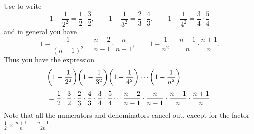 \documentclass[a4paper,oneside,12pt]{article}
\begin{document}
\begin{problem}
{\begin{solution}
Use  to
write
\[
1 - \frac{1}{2^2}
=
\frac{1}{2} \cdot \frac{3}{2},
\qquad
1 - \frac{1}{3^2}
=
\frac{2}{3} \cdot \frac{4}{3},
\qquad
1 - \frac{1}{4^2}
=
\frac{3}{4} \cdot \frac{5}{4}
\]
and in general you have
\[
1 - \frac{1}{(n - 1)^2}
=
\frac{n - 2}{n - 1} \cdot \frac{n}{n - 1},
\qquad
1 - \frac{1}{n^2}
=
\frac{n - 1}{n} \cdot \frac{n + 1}{n}.
\]
Thus you have the expression
\begin{align*}
&\productseq{
  \parenthesis*{1 - \frac{1}{2^2}}
  \parenthesis*{1 - \frac{1}{3^2}}
}{
  \parenthesis*{1 - \frac{1}{4^2}}
}{
  \parenthesis*{1 - \frac{1}{n^2}}
} \\[4pt]
&=
\frac{1}{2} \cdot \frac{3}{2}
\cdot
\frac{2}{3} \cdot \frac{4}{3}
\cdot
\frac{3}{4} \cdot \frac{5}{4}
\cdots
\frac{n - 2}{n - 1} \cdot \frac{n}{n - 1}
\cdot
\frac{n - 1}{n} \cdot \frac{n + 1}{n}.
\end{align*}
Note that all the numerators and denominators cancel out, except for
the factor $\frac{1}{2} \times \frac{n + 1}{n} = \frac{n + 1}{2n}$.
\end{solution}
}{}
\end{problem}
\end{document}
